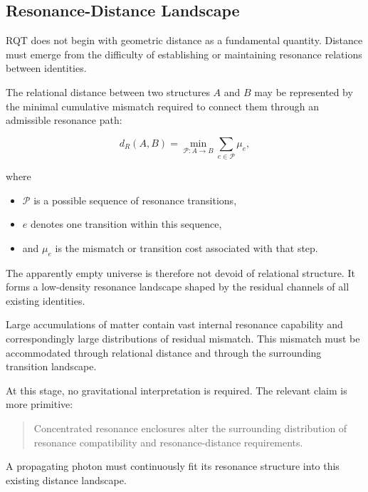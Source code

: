 \documentclass[11pt,a4paper]{article}
\begin{document}

\subsection{Resonance-Distance Landscape}
\label{sec:resonance_distance_landscape}

RQT does not begin with geometric distance as a fundamental quantity. Distance must emerge from the difficulty of establishing or maintaining resonance relations between identities.

The relational distance between two structures $A$ and $B$ may be represented by the minimal cumulative mismatch required to connect them through an admissible resonance path:

\begin{equation}
    d_R(A,B)
    =
    \min_{\mathcal{P}:A\rightarrow B}
    \sum_{e\in\mathcal{P}} \mu_e,
    \label{eq:resonance_distance}
\end{equation}

where

\begin{itemize}
    \item $\mathcal{P}$ is a possible sequence of resonance transitions,
    \item $e$ denotes one transition within this sequence,
    \item and $\mu_e$ is the mismatch or transition cost associated with that step.
\end{itemize}

The apparently empty universe is therefore not devoid of relational structure. It forms a low-density resonance landscape shaped by the residual channels of all existing identities.

Large accumulations of matter contain vast internal resonance capability and correspondingly large distributions of residual mismatch. This mismatch must be accommodated through relational distance and through the surrounding transition landscape.

At this stage, no gravitational interpretation is required. The relevant claim is more primitive:

\begin{quote}
Concentrated resonance enclosures alter the surrounding distribution of resonance compatibility and resonance-distance requirements.
\end{quote}

A propagating photon must continuously fit its resonance structure into this existing distance landscape.
\end{document}
